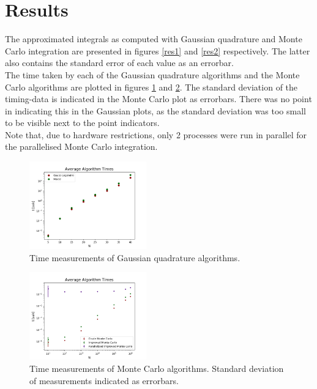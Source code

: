 \documentclass[notitlepage, reprint, nofootinbib]{revtex4-1}
\begin{document}
\section{Results}
The approximated integrals as computed with Gaussian quadrature and Monte Carlo integration are presented in figures \ref{res1} and \ref{res2} respectively. The latter also contains the standard error of each value as an errorbar.\\[2mm]
The time taken by each of the Gaussian quadrature algorithms and the Monte Carlo algorithms are plotted in figures \ref{res3} and \ref{res4}. The standard deviation of the timing-data is indicated in the Monte Carlo plot as errorbars. There was no point in indicating this in the Gaussian plots, as the standard deviation was too small to be visible next to the point indicators. \\[2mm]
Note that, due to hardware restrictions, only 2 processes were run in parallel for the parallelised Monte Carlo integration. 
\begin{figure}[h!]
	\centering
	\includegraphics[width=0.45\textwidth]{../Figures/algo_times_GQ.png}
	\caption{Time measurements of Gaussian quadrature algorithms.}
	\label{res3}
\end{figure}
\begin{figure}[h!]
	\centering
	\includegraphics[width=0.45\textwidth]{../Figures/algo_time_MC.png}
	\caption{Time measurements of Monte Carlo algorithms. Standard deviation of measurements indicated as errorbars.}
	\label{res4}
\end{figure}
\end{document}
